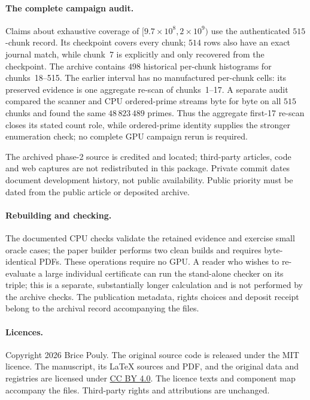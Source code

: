 \paragraph{The complete campaign audit.}
Claims about exhaustive coverage of
$[9.7\times10^8,2\times10^9)$ use the authenticated $515$-chunk record.  Its
checkpoint covers every chunk; $514$ rows also have an exact journal match,
while chunk~7 is explicitly and only recovered from the checkpoint.  The
archive contains $498$ historical per-chunk histograms for chunks~18--515.  The
earlier interval has no manufactured per-chunk cells: its preserved evidence is
one aggregate re-scan of chunks~1--17.  A separate audit compared the scanner
and CPU ordered-prime streams byte for byte on all $515$ chunks and found the
same $48\,823\,489$ primes.  Thus the aggregate first-17 re-scan closes its
stated count role, while ordered-prime identity supplies the stronger
enumeration check; no complete GPU campaign rerun is required.

The archived phase-2 source is credited and located; third-party articles,
code and web captures are not redistributed in this package. Private commit
dates document development history, not public availability. Public priority
must be dated from the public article or deposited archive.

\paragraph{Rebuilding and checking.}
The documented CPU checks validate the retained evidence and exercise small
oracle cases; the paper builder performs two clean builds and requires
byte-identical PDFs. These operations require no GPU. A reader who wishes to
re-evaluate a large individual certificate can run the stand-alone checker on
its triple; this is a separate, substantially longer calculation and is not
performed by the archive checks. The publication metadata, rights choices and
deposit receipt belong to the archival record accompanying the files.

\paragraph{Licences.}
Copyright 2026 Brice Pouly. The original source code is released under the
MIT licence. The manuscript, its \LaTeX{} sources and PDF, and the original
data and registries are licensed under
\href{https://creativecommons.org/licenses/by/4.0/}{CC BY 4.0}.
The licence texts and component map accompany the files. Third-party rights
and attributions are unchanged.
